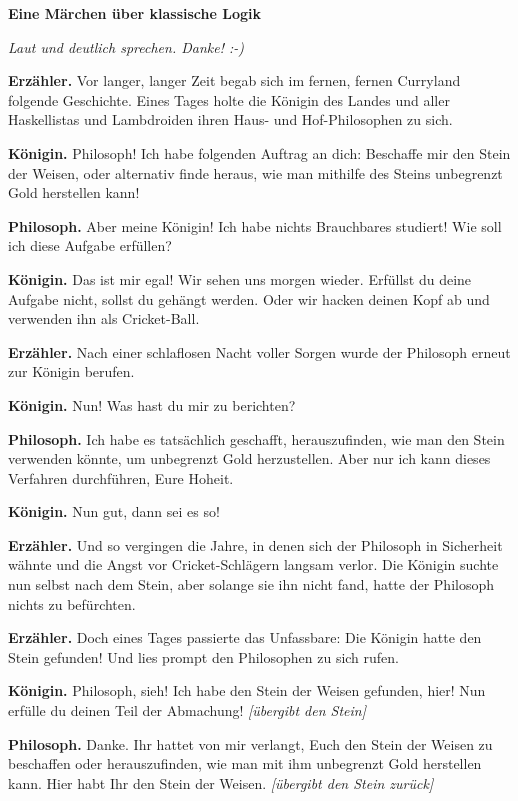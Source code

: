 \documentclass[16pt]{scrartcl}
\begin{document}
\begin{center}
{\large \textbf{Eine Märchen über klassische Logik}}

\emph{Laut und deutlich sprechen. Danke! :-)}
\end{center}

\textbf{Erzähler.}
Vor langer, langer Zeit begab sich im fernen, fernen Curry\-land folgende
Geschichte. Eines Tages holte die Königin des Landes und aller Haskellistas und
Lambdroiden ihren Haus- und Hof-Phi\-lo\-so\-phen zu sich.

\textbf{Königin.}
Philosoph! Ich habe folgenden Auftrag an dich: Beschaffe mir den Stein der
Weisen, oder alternativ finde heraus, wie man mithilfe des Steins unbegrenzt
Gold herstellen kann!

\textbf{Philosoph.}
Aber meine Königin! Ich habe nichts Brauchbares studiert! Wie soll ich diese
Aufgabe erfüllen?

\textbf{Königin.}
Das ist mir egal! Wir sehen uns morgen wieder. Erfüllst du deine Aufgabe nicht,
sollst du gehängt werden. Oder wir hacken deinen Kopf ab und verwenden ihn als
Cricket-Ball.

\textbf{Erzähler.}
Nach einer schlaflosen Nacht voller Sorgen wurde der Philosoph erneut zur
Königin berufen.

\textbf{Königin.}
Nun! Was hast du mir zu berichten?

\textbf{Philosoph.}
Ich habe es tatsächlich geschafft, herauszufinden, wie man den Stein verwenden
könnte, um unbegrenzt Gold herzustellen. Aber nur ich kann dieses Verfahren
durchführen, Eure Hoheit.

\textbf{Königin.}
Nun gut, dann sei es so!

\textbf{Erzähler.}
Und so vergingen die Jahre, in denen sich der Philosoph in Sicherheit wähnte
und die Angst vor Cricket-Schlägern langsam verlor. Die Königin suchte nun
selbst nach dem Stein, aber solange sie ihn nicht fand, hatte der Philosoph
nichts zu befürchten.

\textbf{Erzähler.}
Doch eines Tages passierte das Unfassbare: Die Königin hatte den Stein
gefunden! Und lies prompt den Philosophen zu sich rufen.

\textbf{Königin.}
Philosoph, sieh! Ich habe den Stein der Weisen gefunden, hier! Nun erfülle du
deinen Teil der Abmachung! \emph{[übergibt den Stein]}

\textbf{Philosoph.}
Danke. Ihr hattet von mir verlangt, Euch den Stein der Weisen zu beschaffen
oder herauszufinden, wie man mit ihm unbegrenzt Gold herstellen kann. Hier habt
Ihr den Stein der Weisen. \emph{[übergibt den Stein zurück]}
\end{document}
